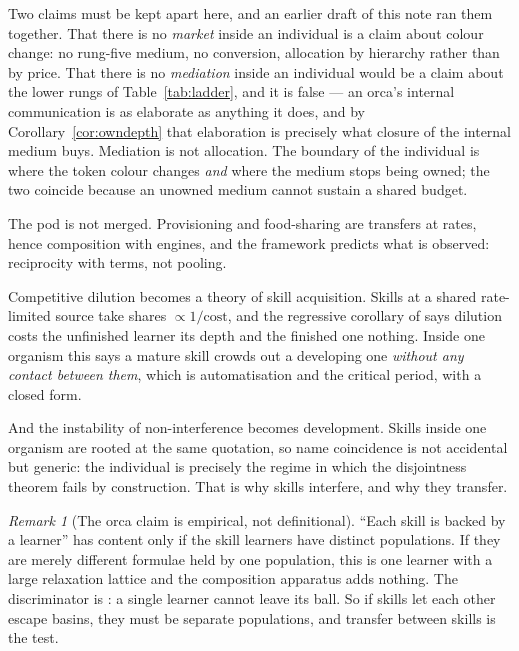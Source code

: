 \documentclass[11pt]{article}
\theoremstyle{plain}
\theoremstyle{definition}
\theoremstyle{remark}
\newtheorem{remark}[theorem]{Remark}
\begin{document}
Two claims must be kept apart here, and an earlier draft of this note ran
them together. That there is no \emph{market} inside an individual is a
claim about colour change: no rung-five medium, no conversion, allocation
by hierarchy rather than by price. That there is no \emph{mediation} inside
an individual would be a claim about the lower rungs of
Table~\ref{tab:ladder}, and it is false --- an orca's internal
communication is as elaborate as anything it does, and by
Corollary~\ref{cor:owndepth} that elaboration is precisely what closure of
the internal medium buys. Mediation is not allocation. The boundary of the
individual is where the token colour changes \emph{and} where the medium
stops being owned; the two coincide because an unowned medium cannot
sustain a shared budget.

The pod is not merged. Provisioning and food-sharing are transfers at
rates, hence composition with engines, and the framework predicts what is
observed: reciprocity with terms, not pooling.

Competitive dilution becomes a theory of skill acquisition. Skills at a
shared rate-limited source take shares $\propto 1/\text{cost}$, and the
regressive corollary of \cite[\S9]{compose} says dilution costs the
unfinished learner its depth and the finished one nothing. Inside one
organism this says a mature skill crowds out a developing one \emph{without
any contact between them}, which is automatisation and the critical period,
with a closed form.

And the instability of non-interference becomes development. Skills inside
one organism are rooted at the same quotation, so name coincidence is not
accidental but generic: the individual is precisely the regime in which the
disjointness theorem fails by construction. That is why skills interfere,
and why they transfer.

\begin{remark}[The orca claim is empirical, not definitional]
``Each skill is backed by a learner'' has content only if the skill
learners have distinct populations. If they are merely different formulae
held by one population, this is one learner with a large relaxation lattice
and the composition apparatus adds nothing. The discriminator is
\cite[Prop.~12]{scientist}: a single learner cannot leave its ball. So if
skills let each other escape basins, they must be separate populations, and
transfer between skills is the test.
\end{remark}

\end{document}

